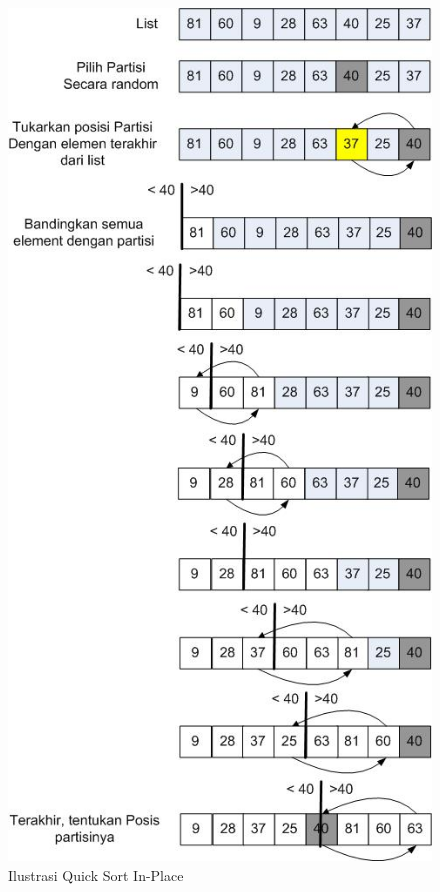 \begin{figure}[htbp]
\begin{center}
	\includegraphics[scale=0.5]{fig/sunario-3/QuickSort2.jpg}%
	\caption{Ilustrasi Quick Sort In-Place}%
	\label{fig:Quick Sort Ilustration 2}%
\end{center}
\end{figure}

